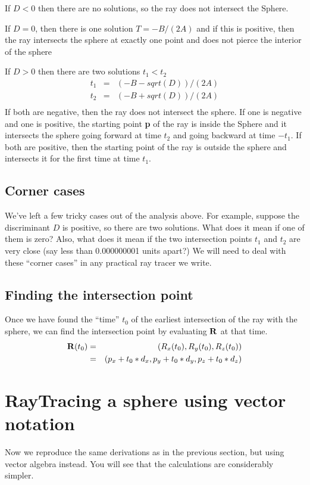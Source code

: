 \documentclass{book}
\newcommand{\vect}[1]{{\bf{ #1}}}
\begin{document}
If $D < 0$ then there are no solutions, so the ray does not intersect
the Sphere.

If $D = 0$, then there is one solution $T = -B/(2A)$ and if this is
positive, then the ray intersects the sphere
at exactly one point and does not pierce the interior of the sphere

If $D > 0$ then there are two solutions $t_1 < t_2$
\begin{eqnarray*}
t_1 &=& (-B - sqrt(D))/(2A)  \\
t_2 &=& (-B + sqrt(D))/(2A)  \\
\end{eqnarray*}
If both are negative, then the ray does not intersect the sphere.
If one is negative and one is positive, the starting point {\vect p} of the ray is inside the Sphere
and it intersects the sphere going forward at time $t_2$ and going backward at time $-t_1$. If both are positive, then the starting point of the ray
is outside the sphere and intersects it for the first time at time $t_1$.

\subsection{Corner cases}
We've left a few tricky cases out of the analysis above. For example,
suppose the discriminant $D$ is positive, so there are two solutions.
What does it mean if one of them is zero? Also, what does it mean if
the two intersection points $t_1$ and $t_2$ are very close (say less than
0.000000001 units apart?) We will need to deal with these ``corner cases''
in any practical ray tracer we write.

\subsection{Finding the intersection point}
Once we have found the ``time'' $t_0$
of the earliest intersection of the ray
with the sphere, we can find the intersection point by evaluating
${\vect R}$
at that time.
\begin{eqnarray*}
{\vect R}(t_0) &=& (R_x(t_0), R_y(t_0),R_z(t_0)) \\
&=&
(p_x + t_0*d_x, p_y + t_0*d_y, p_z + t_0*d_z)
\end{eqnarray*}



\section{RayTracing a sphere using vector notation}
Now we reproduce the same derivations as in the previous section, but using
vector algebra instead. You will see that the calculations are considerably
simpler.
\end{document}
